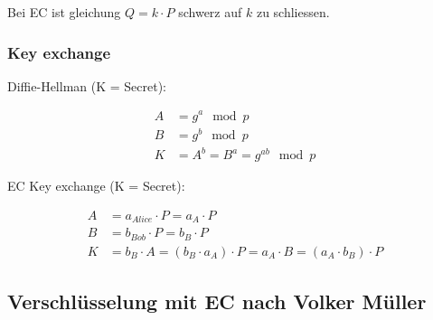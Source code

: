 \documentclass[12pt]{scrartcl}
\begin{document}
Bei EC ist gleichung $Q = k \cdot P$ schwerz auf $k$ zu schliessen.\\





\subsubsection{Key exchange}

Diffie-Hellman (K = Secret): 

\begin{align*}
    A &= g^a \mod p \\
    B &= g^b \mod p \\
    K &= A^b = B^a = g^{ab} \mod p    
\end{align*}

EC Key exchange (K = Secret):

\begin{align*}
    A &= a_{Alice} \cdot P = a_A \cdot P\\
    B &= b_{Bob} \cdot P = b_B \cdot P \\
    K &= b_B \cdot A = (b_B \cdot a_A) \cdot P = a_A \cdot B = (a_A \cdot b_B) \cdot P
\end{align*}


\newpage
\subsection{Verschlüsselung mit EC nach Volker Müller}
\end{document}
